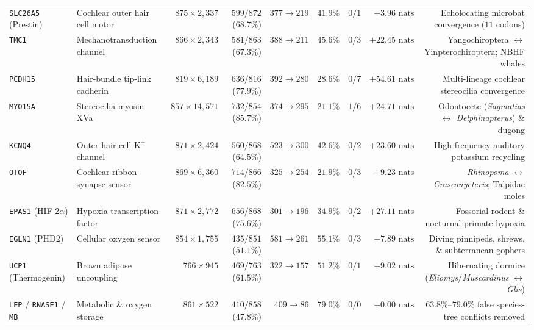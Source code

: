\documentclass[11pt,a4paper]{article}
\begin{document}
\begin{table}[t!]
{\begin{tabular}{@{}llrrrrrrr@{}}
\midrule
\texttt{SLC26A5} (Prestin) & Cochlear outer hair cell motor & $875 \times 2,337$ & $599 / 872$ ($68.7\%$) & $377 \to 219$ & $41.9\%$ & $0 / 1$ & $+3.96\text{ nats}$ & Echolocating microbat convergence ($11$ codons) \\
\texttt{TMC1} & Mechanotransduction channel & $866 \times 2,343$ & $581 / 863$ ($67.3\%$) & $388 \to 211$ & $45.6\%$ & $0 / 3$ & $+22.45\text{ nats}$ & Yangochiroptera $\leftrightarrow$ Yinpterochiroptera; NBHF whales \\
\texttt{PCDH15} & Hair-bundle tip-link cadherin & $819 \times 6,189$ & $636 / 816$ ($77.9\%$) & $392 \to 280$ & $28.6\%$ & $0 / 7$ & $+54.61\text{ nats}$ & Multi-lineage cochlear stereocilia convergence \\
\texttt{MYO15A} & Stereocilia myosin XVa & $857 \times 14,571$ & $732 / 854$ ($85.7\%$) & $374 \to 295$ & $21.1\%$ & $1 / 6$ & $+24.71\text{ nats}$ & Odontocete (\textit{Sagmatias} $\leftrightarrow$ \textit{Delphinapterus}) \& dugong \\
\texttt{KCNQ4} & Outer hair cell $\text{K}^+$ channel & $871 \times 2,424$ & $560 / 868$ ($64.5\%$) & $523 \to 300$ & $42.6\%$ & $0 / 2$ & $+23.60\text{ nats}$ & High-frequency auditory potassium recycling \\
\texttt{OTOF} & Cochlear ribbon-synapse sensor & $869 \times 6,360$ & $714 / 866$ ($82.5\%$) & $325 \to 254$ & $21.9\%$ & $0 / 3$ & $+9.23\text{ nats}$ & \textit{Rhinopoma} $\leftrightarrow$ \textit{Craseonycteris}; Talpidae moles \\
\addlinespace
\texttt{EPAS1} (HIF-2$\alpha$) & Hypoxia transcription factor & $871 \times 2,772$ & $656 / 868$ ($75.6\%$) & $301 \to 196$ & $34.9\%$ & $0 / 2$ & $+27.11\text{ nats}$ & Fossorial rodent \& nocturnal primate hypoxia \\
\texttt{EGLN1} (PHD2) & Cellular oxygen sensor & $854 \times 1,755$ & $435 / 851$ ($51.1\%$) & $581 \to 261$ & $55.1\%$ & $0 / 3$ & $+7.89\text{ nats}$ & Diving pinnipeds, shrews, \& subterranean gophers \\
\texttt{UCP1} (Thermogenin) & Brown adipose uncoupling & $766 \times 945$ & $469 / 763$ ($61.5\%$) & $322 \to 157$ & $51.2\%$ & $0 / 1$ & $+9.02\text{ nats}$ & Hibernating dormice (\textit{Eliomys}/\textit{Muscardinus} $\leftrightarrow$ \textit{Glis}) \\
\texttt{LEP} / \texttt{RNASE1} / \texttt{MB} & Metabolic \& oxygen storage & $861 \times 522$ & $410 / 858$ ($47.8\%$) & $409 \to 86$ & $79.0\%$ & $0 / 0$ & $+0.00\text{ nats}$ & $63.8\%$--$79.0\%$ false species-tree conflicts removed \\

\end{tabular}}
\end{table}
\end{document}

